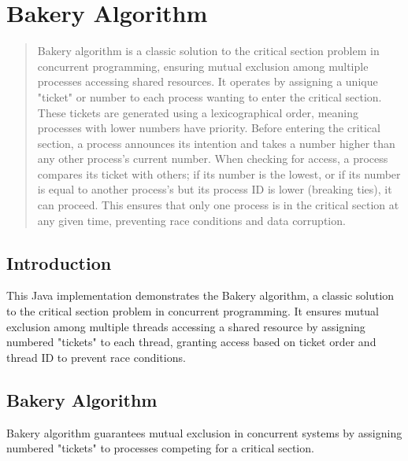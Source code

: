 \documentclass{report}
\begin{document}
\chapter{Bakery Algorithm}
\author{Shahriar Hooshmand}



\begin{abstract} %
Bakery algorithm is a classic solution to the critical section problem in concurrent programming, ensuring mutual exclusion among multiple processes accessing shared resources. It operates by assigning a unique "ticket" or number to each process wanting to enter the critical section. These tickets are generated using a lexicographical order, meaning processes with lower numbers have priority. Before entering the critical section, a process announces its intention and takes a number higher than any other process's current number. When checking for access, a process compares its ticket with others; if its number is the lowest, or if its number is equal to another process's but its process ID is lower (breaking ties), it can proceed. This ensures that only one process is in the critical section at any given time, preventing race conditions and data corruption.
\end{abstract}

\section{Introduction} %

This Java implementation demonstrates the Bakery algorithm, a classic solution to the critical section problem in concurrent programming. It ensures mutual exclusion among multiple threads accessing a shared resource by assigning numbered "tickets" to each thread, granting access based on ticket order and thread ID to prevent race conditions.

\section{Bakery Algorithm}

Bakery algorithm guarantees mutual exclusion in concurrent systems by assigning numbered "tickets" to processes competing for a critical section.
\end{document}
